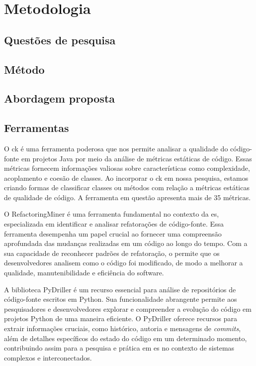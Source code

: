 
\chapter{Metodologia}\label{cap:Metodologia}

\section{Questões de pesquisa}

\section{Método}

\section{Abordagem proposta}

\section{Ferramentas}\label{sec:ferramentas}
O \gls{ck} \cite{aniche-ck} é uma ferramenta poderosa que nos permite analisar a qualidade do código-fonte em projetos Java por meio da análise de métricas estáticas de código. Essas métricas fornecem informações valiosas sobre características como complexidade, acoplamento e coesão de classes. Ao incorporar o \gls{ck} em nossa pesquisa, estamos criando formas de classificar classes ou métodos com relação a métricas estáticas de qualidade de código. A ferramenta em questão apresenta mais de 35 métricas.

O RefactoringMiner \cite{Tsantalis:ICSE:2018:RefactoringMiner} é uma ferramenta fundamental no contexto da \gls{es}, especializada em identificar e analisar refatorações de código-fonte. Essa ferramenta desempenha um papel crucial ao fornecer uma compreensão aprofundada das mudanças realizadas em um código ao longo do tempo. Com a sua capacidade de reconhecer padrões de refatoração, o \cite{Tsantalis:ICSE:2018:RefactoringMiner} permite que os desenvolvedores analisem como o código foi modificado, de modo a melhorar a qualidade, manutenibilidade e eficiência do software.

A biblioteca PyDriller \cite{PyDrillerSpadini2018} é um recurso essencial para análise de repositórios de código-fonte escritos em Python. Sua funcionalidade abrangente permite aos pesquisadores e desenvolvedores explorar e compreender a evolução do código em projetos Python de uma maneira eficiente. O PyDriller oferece recursos para extrair informações cruciais, como histórico, autoria e mensagens de \textit{commits}, além de detalhes específicos do estado do código em um determinado momento, contribuindo assim para a pesquisa e prática em \gls{es} no contexto de sistemas complexos e interconectados.

